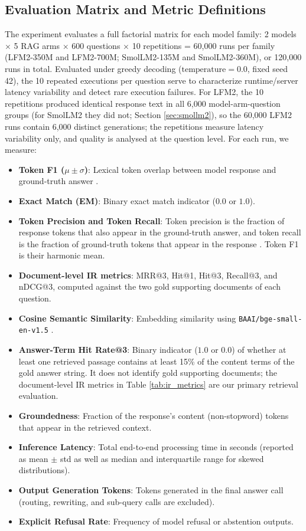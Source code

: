 \documentclass[10pt]{article}
\begin{document}
\subsection{Evaluation Matrix and Metric Definitions}
The experiment evaluates a full factorial matrix for each model family: 2 models $\times$ 5 RAG arms $\times$ 600 questions $\times$ 10 repetitions = 60,000 runs per family (LFM2-350M and LFM2-700M; SmolLM2-135M and SmolLM2-360M), or 120,000 runs in total. Evaluated under greedy decoding ($\text{temperature}=0.0$, fixed seed 42), the 10 repeated executions per question serve to characterize runtime/server latency variability and detect rare execution failures. For LFM2, the 10 repetitions produced identical response text in all 6,000 model-arm-question groups (for SmolLM2 they did not; Section \ref{sec:smollm2}), so the 60,000 LFM2 runs contain 6,000 distinct generations; the repetitions measure latency variability only, and quality is analysed at the question level. For each run, we measure:
\begin{itemize}
    \item \textbf{Token F1 ($\mu \pm \sigma$)}: Lexical token overlap between model response and ground-truth answer \citep{rajpurkar2016squad}.
    \item \textbf{Exact Match (EM)}: Binary exact match indicator ($0.0$ or $1.0$).
    \item \textbf{Token Precision and Token Recall}: Token precision is the fraction of response tokens that also appear in the ground-truth answer, and token recall is the fraction of ground-truth tokens that appear in the response \citep{adlakha2024evaluating}. Token F1 is their harmonic mean.
    \item \textbf{Document-level IR metrics}: MRR@3, Hit@1, Hit@3, Recall@3, and nDCG@3, computed against the two gold supporting documents of each question.
    \item \textbf{Cosine Semantic Similarity}: Embedding similarity using \texttt{BAAI/bge-small-en-v1.5} \citep{reimers2019sentence, bge2023embedding}.
    \item \textbf{Answer-Term Hit Rate@3}: Binary indicator ($1.0$ or $0.0$) of whether at least one retrieved passage contains at least 15\% of the content terms of the gold answer string. It does not identify gold supporting documents; the document-level IR metrics in Table \ref{tab:ir_metrics} are our primary retrieval evaluation.
    \item \textbf{Groundedness}: Fraction of the response's content (non-stopword) tokens that appear in the retrieved context.
    \item \textbf{Inference Latency}: Total end-to-end processing time in seconds (reported as mean $\pm$ std as well as median and interquartile range for skewed distributions).
    \item \textbf{Output Generation Tokens}: Tokens generated in the final answer call (routing, rewriting, and sub-query calls are excluded).
    \item \textbf{Explicit Refusal Rate}: Frequency of model refusal or abstention outputs.
\end{itemize}
\end{document}
